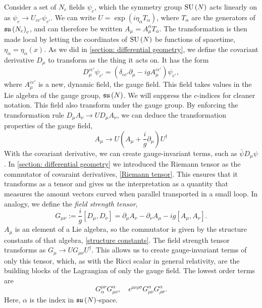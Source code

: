 Consider a set of $N_c$ fields $\psi_c$, which the symmetry group $\text{SU}\left(N\right)$ acts linearly on as $\psi_c \rightarrow U_{cc'} \psi_{c'}$.
We can write $U = \exp(i \eta_\alpha T_\alpha)$, where $T_\alpha$ are the generators of $\mathfrak{su}\left(N_c\right)_c$, and can therefore be written $A_\mu = A_\mu^\alpha T_\alpha$.
The transformation is then made local by letting the coordinates of $\text{SU}\left(N\right)$ be functions of spacetime, $\eta_\alpha = \eta_\alpha(x)$.
As we did in \autoref{section: differential geometry}, we define the covariant derivative $D_\mu$ to transform as the thing it acts on.
It has the form
%
\begin{equation}
    D_\mu^{cc'} \psi_{c'} = (\delta_{cc'}\partial_\mu - i g A_\mu^{cc'} )\psi_{c'},
\end{equation}
%
where $A_\mu^{cc'}$ is a new, dynamic field, the gauge field.
This field takes values in the Lie algebra of the gauge group, $\mathfrak{su}\left(N\right)$.
We will suppress the $c$-indices for cleaner notation.
This field also transform under the gauge group.
By enforcing the transformation rule $D_\mu A_\nu \rightarrow U D_\mu A_\nu$, we can deduce the transformation properties of the gauge field, 
%
\begin{equation}
    \label{Gauge transformation gauge field}
    A_\mu\rightarrow U \left(A_\mu + \frac{i}{g} \partial_\mu\right) U^\dagger
\end{equation}
%
With the covariant derivative, we can create gauge-invariant terms, such as $\bar \psi D_\mu \psi$.
In \autoref{section: differential geometry} we introduced the Riemann tensor as the commutator of covaraint derivatives, \autoref{Riemann tensor}.
This ensures that it transforms as a tensor and gives us the interpretation as a quantity that measures the amount vectors curved when parallel transported in a small loop.
In analogy, we define the \emph{field strength tensor},
%
\begin{equation}
    G_{\mu \nu} := \frac{i}{g} [D_\mu, D_\nu]
    = \partial_\mu A_\nu - \partial_\nu A_\mu - i g[A_\mu, A_\nu].
\end{equation}
%
$A_\mu$ is an element of a Lie algebra, so the commutator is given by the structure constants of that algebra, \autoref{structure constants}.
The field strength tensor transforms as $G_\mu \rightarrow U G_{\mu \nu}U^\dagger$.
This allows us to create gauge-invariant terms of only this tensor, which, as with the Ricci scalar in general relativity, are the building blocks of the Lagrangian of only the gauge field.
The lowest order terms are
%
\begin{equation}
    G^{\mu \nu}_\alpha G_{\mu \nu}^\alpha, \quad
    \epsilon^{\mu \nu \rho \sigma} G_{\mu \nu}^\alpha G_{\rho \sigma}^\alpha.
\end{equation}
%
Here, $\alpha$ is the index in $\mathfrak{su}\left(N\right)$-space.

